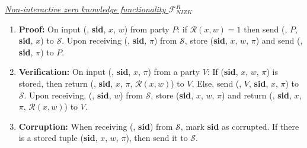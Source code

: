 \begin{tcolorbox}[colback=white, arc=5pt]
    \noindent\emph{\underline{Non-interactive zero knowledge functionality $\mathcal{F}_{NIZK}^{R}$}}\\[5pt]
    \begin{enumerate}
        \item \textbf{Proof:} On input (, \textbf{sid}, $x$, $w$) from party $P$: if $\mathcal{R}(x, w)=1$ then send (, $P$, \textbf{sid}, $x$) to $\mathcal{S}$. Upon receiving (, \textbf{sid}, $\pi$) from $\mathcal{S}$, store (\textbf{sid}, $x$, $w$, $\pi$) and send (, \textbf{sid}, $\pi$) to $P$.
        \item \textbf{Verification:} On input (, \textbf{sid}, $x$, $\pi$) from a party $V$: If (\textbf{sid}, $x$, $w$, $\pi$) is stored, then return (, \textbf{sid}, $x$, $\pi$, $\mathcal{R}(x, w)$) to $V$. Else, send (, $V$, \textbf{sid}, $x$, $\pi$) to $\mathcal{S}$. Upon receiving, (, $\textbf{sid}$, $w$) from $\mathcal{S}$, store (\textbf{sid}, $x$, $w$, $\pi$) and return (, \textbf{sid}, $x$, $\pi$, $\mathcal{R}(x, w)$) to $V$.
        \item \textbf{Corruption:} When receiving (, \textbf{sid}) from $\mathcal{S}$, mark \textbf{sid} as corrupted. If there is a stored tuple (\textbf{sid}, $x$, $w$, $\pi$), then send it to $\mathcal{S}$.
    \end{enumerate}
\end{tcolorbox}
\label{fig:zk_functionality}